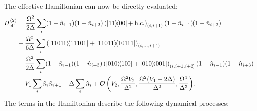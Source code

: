 \documentclass[english,floatfix,twocolumn,showpacs, aps, prx, reprint, superscriptaddress, longbibliography]{revtex4-2}
\begin{document}
The effective Hamiltonian can now be directly evaluated:
\begin{align}
H_{\mathrm{eff}}^{(2)} 
&=  \frac{\Omega^2}{2\Delta} \sum_{i} (1-\hat{n}_{i-1}) (1-\hat{n}_{i+2}) \left( \outerproduct{11}{00} + \mathrm{h.c.} \right)_{(i,i+1)} (1-\hat{n}_{i-1}) (1-\hat{n}_{i+2}) \label{eq:Heff_2islands_t1}\\
& + \frac{\Omega^2}{6\Delta} \sum_{i}  \left( \outerproduct{11011}{11101} + \outerproduct{11011}{10111} \right)_{(i,\ldots,i+4)} \label{eq:Heff_2islands_t2} \\
& - \frac{\Omega^2}{2\Delta} \sum_{i} (1-\hat{n}_{i-1}) (1-\hat{n}_{i+3}) \left( \outerproduct{010}{100} + \outerproduct{010}{001} \right)_{(i,i+1,i+2)} (1-\hat{n}_{i-1}) (1-\hat{n}_{i+3})\label{eq:Heff_2islands_t3}\\
& + V_1 \sum_i \hat{n}_i \hat{n}_{i+1} - \Delta\sum_i\hat{n}_i  + \mathcal{O} \left(V_2, \frac{\Omega^2V_2}{\Delta^2}, \frac{\Omega^2(V_1-2\Delta)}{\Delta^2}, \frac{\Omega^4}{\Delta^3} \right) \label{eq:Heff_2islands_t4}.
\end{align}
The terms in the Hamiltonian describe the following dynamical processes:
\end{document}
